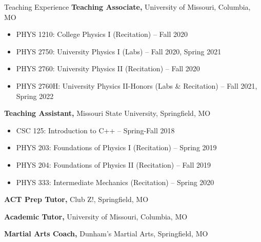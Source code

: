 \begin{rubric}{Teaching Experience}
    \entry*[2020 -- 2022]%
        \textbf{Teaching Associate,} University of Missouri, Columbia, MO
        \begin{itemize}
            \item PHYS 1210: College Physics I (Recitation) -- Fall 2020
            \item PHYS 2750: University Physics I (Labs) -- Fall 2020, Spring 2021
            \item PHYS 2760: University Physics II (Recitation) -- Fall 2020
            \item PHYS 2760H: University Physics II-Honors (Labs \& Recitation) -- Fall 2021, Spring 2022
        \end{itemize}
    
    \entry*[2019 -- 2020]%
        \textbf{Teaching Assistant,} Missouri State University, Springfield, MO
        \begin{itemize}
            \item CSC 125: Introduction to C++ -- Spring-Fall 2018
            \item PHYS 203: Foundations of Physics I (Recitation) -- Spring 2019
            \item PHYS 204: Foundations of Physics II (Recitation) -- Fall 2019
            \item PHYS 333: Intermediate Mechanics (Recitation) -- Spring 2020
        \end{itemize}
    
    \entry*[2018 -- 2021]%
        \textbf{ACT Prep Tutor,} Club Z!, Springfield, MO
    
    \entry*[2021 -- Present]%
        \textbf{Academic Tutor,} University of Missouri, Columbia, MO
    
    \entry*[2014 -- 2020]%
        \textbf{Martial Arts Coach,} Dunham's Martial Arts, Springfield, MO
\end{rubric}
